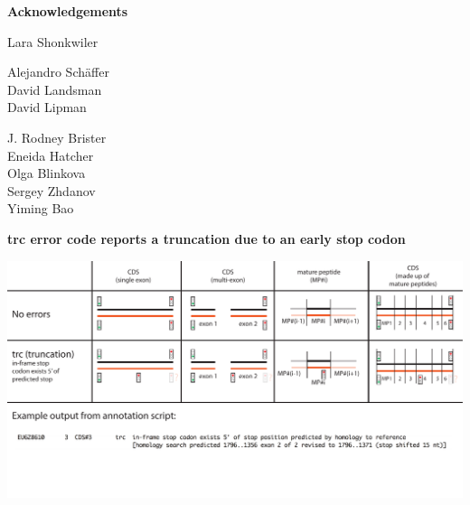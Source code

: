 \documentclass[landscape]{slides}
\begin{document}
\begin{slide}

\large
\begin{center}
\large{\textbf{Acknowledgements}} \\

\vspace{0.5in}

Lara Shonkwiler \\

\vspace{0.5in}

Alejandro Sch\"{a}ffer \\
David Landsman \\
David Lipman

\vspace{0.5in}

J. Rodney Brister \\
Eneida Hatcher \\
Olga Blinkova \\
Sergey Zhdanov \\ 
Yiming Bao \\

\end{center}

\vfill
\end{slide}
\begin{slide}
\begin{center}
\textbf{trc error code reports a truncation due to an early stop codon}
\vspace{0.5in}

\includegraphics[width=10in]{figs/errornew-1-trc}
\end{center}
\vfill
\end{slide}
\end{document}
